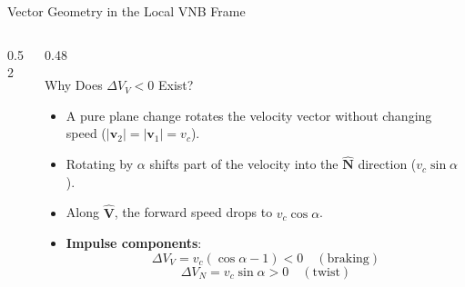 \documentclass[aspectratio=169,10pt]{beamer}
\begin{document}
\begin{frame}{Vector Geometry in the Local VNB Frame}
\begin{columns}[c]
\begin{column}{0.52\textwidth}
        \end{column}
        \begin{column}{0.48\textwidth}
            \begin{block}{Why Does $\Delta V_V < 0$ Exist?}
                \footnotesize
                \begin{itemize}\setlength{\itemsep}{2pt}
                    \item A pure plane change rotates the velocity vector without changing speed ($|\mathbf{v}_2| = |\mathbf{v}_1| = v_c$).
                    \item Rotating by $\alpha$ shifts part of the velocity into the $\mathbf{\hat{N}}$ direction ($v_c \sin\alpha$).
                    \item Along $\mathbf{\hat{V}}$, the forward speed drops to $v_c \cos\alpha$.
                    \item \textbf{Impulse components}:
                    $$\Delta V_V = v_c(\cos\alpha - 1) < 0 \quad (\text{braking})$$
                    $$\Delta V_N = v_c \sin\alpha > 0 \quad (\text{twist})$$
                \end{itemize}
            \end{block}
        \end{column}
    \end{columns}
\end{frame}
\end{document}
